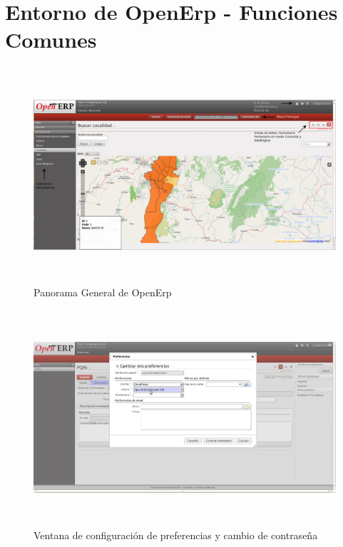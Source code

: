 %
%
%
\section{Entorno de OpenErp - Funciones Comunes}
\begin{figure}[h]
 \centering
 \includegraphics[width=17cm,height=8cm]{./Imagenes/enviroment.png}
 \caption{Panorama General de OpenErp}
 \label{fig:enviroment}
\end{figure}

\begin{figure}
 \centering
 \includegraphics[width=17cm,height=8cm]{./Imagenes/configuracion.png}
 \caption{Ventana de configuración de preferencias y cambio de contraseña}
 \label{fig:configuracion}
\end{figure}

